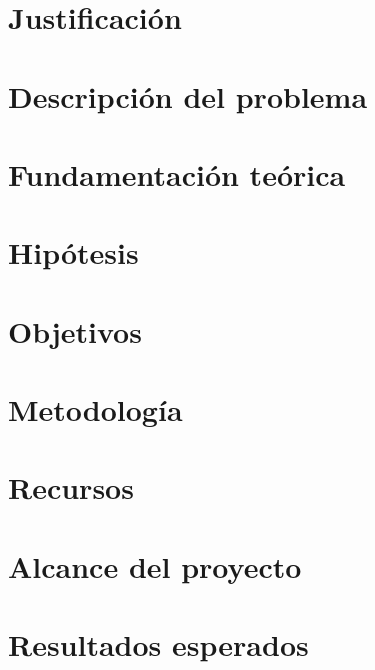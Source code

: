 \documentclass[12pt, letterpaper, spanish, twoside]{article}
\begin{document}
\section{Justificación}


\section{Descripción del problema}


\section{Fundamentación teórica}


\section{Hipótesis}


\section{Objetivos}


\section{Metodología}


\section{Recursos}


\section{Alcance del proyecto}


\section{Resultados esperados}


\nocite{*} %
\renewcommand{\refname}{Referencias bibliográficas}


\end{document}
